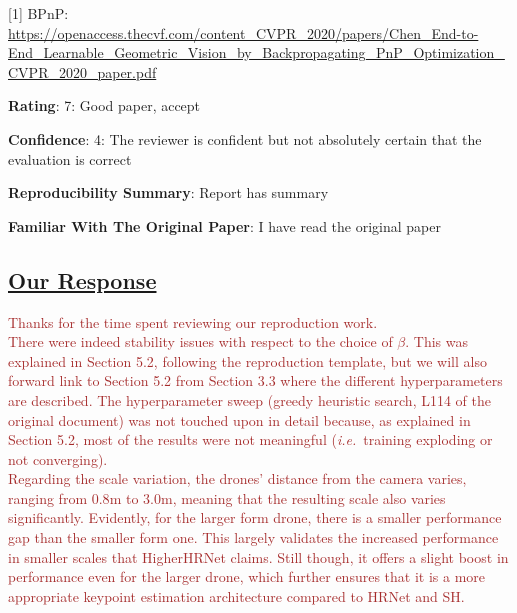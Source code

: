\documentclass{article}
\begin{document}
[1] BPnP: \url{https://openaccess.thecvf.com/content_CVPR_2020/papers/Chen_End-to-End_Learnable_Geometric_Vision_by_Backpropagating_PnP_Optimization_CVPR_2020_paper.pdf}

\textbf{Rating}: 7: Good paper, accept

\textbf{Confidence}: 4: The reviewer is confident but not absolutely certain that the evaluation is correct

\textbf{Reproducibility Summary}: Report has summary

\textbf{Familiar With The Original Paper}: I have read the original paper

\subsection{\uline{Our Response}}

\textcolor{brown}{
Thanks for the time spent reviewing our reproduction work.\\
There were indeed stability issues with respect to the choice of $\beta$. 
This was explained in Section 5.2, following the reproduction template, but we will also forward link to Section 5.2 from Section 3.3 where the different hyperparameters are described.
The hyperparameter sweep (greedy heuristic search, L114 of the original document) was not touched upon in detail because, as explained in Section 5.2, most of the results were not meaningful (\textit{i.e.}~training exploding or not converging).\\
Regarding the scale variation, the drones' distance from the camera varies, ranging from $0.8$m to $3.0$m, meaning that the resulting scale also varies significantly.
Evidently, for the larger form drone, there is a smaller performance gap than the smaller form one.
This largely validates the increased performance in smaller scales that HigherHRNet claims.
Still though, it offers a slight boost in performance even for the larger drone, which further ensures that it is a more appropriate keypoint estimation architecture compared to HRNet and SH.
}

\iffalse
\begin{enumerate}
    \item There were stability issues as we explained in Section 5.2.
    \item We performed a greedy search as explained in the paper (line 114): Specifically, for BPnP we set $\beta$ value to $1e-5$ after conducting a greedy heuristic search, with values $114$ ranging from $0.001$ to $1e-9$, as the proposed value for $\beta$ coefficient, did not work for our case
    \item The drone's distance from the camera varies ranging from 0.8m, to 3m, meaning that the resulting scale in the image also varies significantly.
    \item For the larger form drone there is a smaller discrepancy, but for the smaller form drone the deviation is significantly larger, a fact that validates the increased performance in smaller scales that HigherHRNet claims.
    Still though, the architecture change from HRNet to HigherHRNet offers a boost in performance -- albeit smaller -- even for the larger form drone.
\end{enumerate}
\fi
\end{document}
